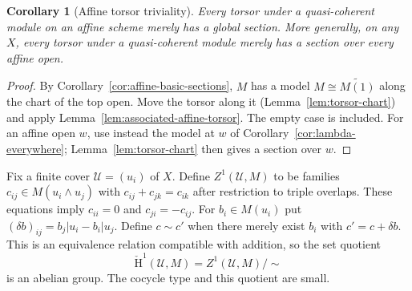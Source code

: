 \documentclass[11pt]{amsart}
\newtheorem{corollary}[theorem]{Corollary}
\theoremstyle{definition}\newtheorem{definition}[theorem]{Definition}
\theoremstyle{remark}\newtheorem{remark}[theorem]{Remark}
\newcommand{\CC}{\check{\mathrm H}}
\begin{document}
\begin{corollary}[Affine torsor triviality]\label{lem:affine-torsor}
Every torsor under a quasi-coherent module on an affine scheme
merely has a global section. More generally, on any $X$, every torsor
under a quasi-coherent module merely has a section over every affine
open.
\end{corollary}
\begin{proof}
By Corollary~\ref{cor:affine-basic-sections}, $M$ has a model
$M\cong\widetilde{M(1)}$ along the chart of the top open. Move the
torsor along it (Lemma~\ref{lem:torsor-chart}) and apply
Lemma~\ref{lem:associated-affine-torsor}. The empty case is included.
For an affine open $w$, use instead the model at $w$ of
Corollary~\ref{cor:lambda-everywhere}; Lemma~\ref{lem:torsor-chart}
then gives a section over $w$.
\end{proof}

Fix a finite cover $\mathcal U=(u_i)$ of $X$. Define
$Z^1(\mathcal U,M)$ to be families $c_{ij}\in M(u_i\wedge u_j)$
with $c_{ij}+c_{jk}=c_{ik}$ after restriction to triple overlaps.
These equations imply $c_{ii}=0$ and $c_{ji}=-c_{ij}$.
For $b_i\in M(u_i)$ put
$(\delta b)_{ij}=b_j|u_i-b_i|u_j$.
Define $c\sim c'$ when there merely exist $b_i$ with
$c'=c+\delta b$. This is an equivalence relation compatible with
addition, so the set quotient
\[
 \CC^1(\mathcal U,M)=Z^1(\mathcal U,M)/\!\sim
\]
is an abelian group. The cocycle type and this quotient are small.
\end{document}
